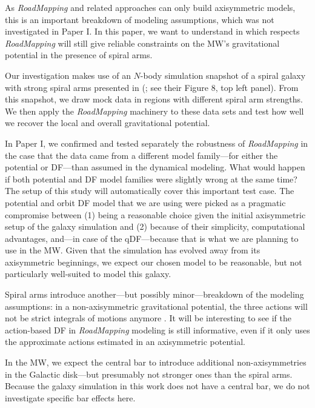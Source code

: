 \documentclass[iop,revtex4,numberedappendix,appendixfloats]{emulateapj}
\newcommand{\RM}{{\sl RoadMapping}}
\begin{document}
As \RM{} and related approaches can only build axisymmetric models, this is an important breakdown of modeling assumptions, which was not investigated in Paper I. In this paper, we want to understand in which respects \RM{} will still give reliable constraints on the MW's gravitational potential in the presence of spiral arms.

Our investigation makes use of an $N$-body simulation snapshot of a spiral galaxy with strong spiral arms presented in (\citealt{2013ApJ...766...34D}; see their Figure 8, top left panel). From this snapshot, we draw mock data in regions with different spiral arm strengths. We then apply the \RM{} machinery to these data sets and test how well we recover the local and overall gravitational potential.

In Paper I, we confirmed and tested separately the robustness of \RM{} in the case that the data came from a different model family---for either the potential or DF---than assumed in the dynamical modeling. What would happen if both potential and DF model families were slightly wrong at the same time? The setup of this study will automatically cover this important test case. The potential and orbit DF model that we are using were picked as a pragmatic compromise between (1) being a reasonable choice given the initial axisymmetric setup of the galaxy simulation and (2) because of their simplicity, computational advantages, and---in case of the qDF---because that is what we are planning to use in the MW. Given that the simulation has evolved away from its axisymmetric beginnings, we expect our chosen model to be reasonable, but not particularly well-suited to model this galaxy.

Spiral arms introduce another---but possibly minor---breakdown of the modeling assumptions: in a non-axisymmetric gravitational potential, the three actions will not be strict integrals of motions anymore \citep{2008gady.book.....B,2011A&A...527A.147M,2012A&A...548A.127M,2012MNRAS.421.1529G,2012MNRAS.422.1363S,2016ApJ...824...39V}. It will be interesting to see if the action-based DF in \RM{} modeling is still informative, even if it only uses the approximate actions estimated in an axisymmetric potential.

In the MW, we expect the central bar to introduce additional non-axisymmetries in the Galactic disk---but presumably not stronger ones than the spiral arms. Because the galaxy simulation in this work does not have a central bar, we do not investigate specific bar effects here.
\end{document}
